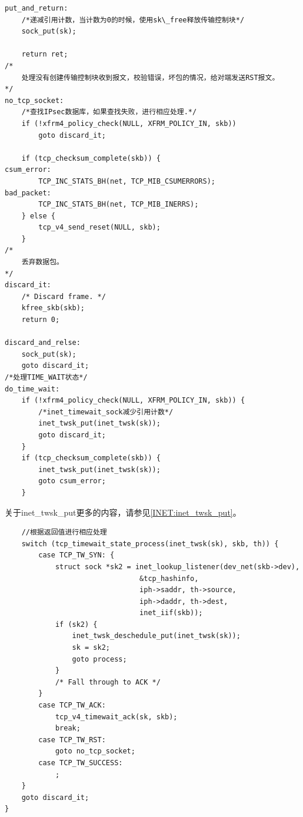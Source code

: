 \begin{verbatim}
put_and_return:
    /*递减引用计数，当计数为0的时候，使用sk\_free释放传输控制块*/
    sock_put(sk);

    return ret;
/*
    处理没有创建传输控制块收到报文，校验错误，坏包的情况，给对端发送RST报文。
*/
no_tcp_socket:
    /*查找IPsec数据库，如果查找失败，进行相应处理.*/
    if (!xfrm4_policy_check(NULL, XFRM_POLICY_IN, skb))
        goto discard_it;

    if (tcp_checksum_complete(skb)) {
csum_error:
        TCP_INC_STATS_BH(net, TCP_MIB_CSUMERRORS);
bad_packet:
        TCP_INC_STATS_BH(net, TCP_MIB_INERRS);
    } else {
        tcp_v4_send_reset(NULL, skb);
    }
/*
    丢弃数据包。    
*/
discard_it:
    /* Discard frame. */
    kfree_skb(skb);
    return 0;

discard_and_relse:
    sock_put(sk);
    goto discard_it;
/*处理TIME_WAIT状态*/
do_time_wait:
    if (!xfrm4_policy_check(NULL, XFRM_POLICY_IN, skb)) {
        /*inet_timewait_sock减少引用计数*/      
        inet_twsk_put(inet_twsk(sk));
        goto discard_it;
    }
    if (tcp_checksum_complete(skb)) {
        inet_twsk_put(inet_twsk(sk));
        goto csum_error;
    }
\end{verbatim}
    关于inet\_twsk\_put更多的内容，请参见\ref{INET:inet_twsk_put}。

\begin{verbatim}
    //根据返回值进行相应处理
    switch (tcp_timewait_state_process(inet_twsk(sk), skb, th)) {
        case TCP_TW_SYN: {
            struct sock *sk2 = inet_lookup_listener(dev_net(skb->dev),
                                &tcp_hashinfo,
                                iph->saddr, th->source,
                                iph->daddr, th->dest,
                                inet_iif(skb));
            if (sk2) {
                inet_twsk_deschedule_put(inet_twsk(sk));
                sk = sk2;
                goto process;
            }
            /* Fall through to ACK */
        }
        case TCP_TW_ACK:
            tcp_v4_timewait_ack(sk, skb);
            break;
        case TCP_TW_RST:
            goto no_tcp_socket;
        case TCP_TW_SUCCESS:
            ;
    }
    goto discard_it;
}
\end{verbatim}

